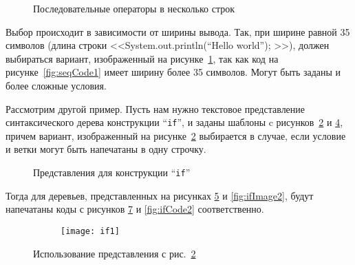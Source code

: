 \begin{figure}[h!]
	\centering
	
	\caption{Последовательные операторы в несколько строк}
	\label{fig:seqCode2}
\end{figure}

Выбор происходит в зависимости от ширины вывода. Так, при ширине равной 35 символов (длина строки <<System.out.println(“Hello world”); >>), должен выбираться вариант, изображенный на рисунке~\ref{fig:seqCode2}, так как код на рисунке~\ref{fig:seqCode1} имеет ширину более 35 символов.
Могут быть заданы и более сложные условия.

Рассмотрим другой пример. Пусть нам нужно текстовое представление синтаксического дерева конструкции “\lstinline{if}”, и заданы шаблоны c рисунков~\ref{fig:ifTemplate2} и \ref{fig:ifTemplate1}, причем вариант, изображенный на рисунке~\ref{fig:ifTemplate2} выбирается в случае, если условие и ветки могут быть напечатаны в одну строчку.

\begin{figure}[h!]
	\begin{subfigure}[b]{0.45\textwidth}
		
		\caption{}
		\label{fig:ifTemplate2}
	\end{subfigure}
	\hspace{1cm}
	\begin{subfigure}[b]{0.45\textwidth}
		
		\caption{}
		\label{fig:ifTemplate1}
	\end{subfigure}
	\caption{Представления для конструкции “\lstinline{if}”}
\end{figure}


Тогда для деревьев, представленных на рисунках \ref{fig:ifImage1} и \ref{fig:ifImage2}, будут напечатаны коды с рисунков \ref{fig:ifCode1} и \ref{fig:ifCode2} соответственно.

\begin{figure}[h!]
	\begin{subfigure}[b]{0.60\linewidth}
		\centering
		\texttt{[image: if1]}
		\caption{}
		\label{fig:ifImage1}
	\end{subfigure}
	\hspace{0.5cm}
	\begin{subfigure}[b]{0.30\linewidth}
		\centering
		
		\caption{}
		\label{fig:ifCode1}
	\end{subfigure}

	\caption{Использование представления с рис.~\ref{fig:ifTemplate2}}
\end{figure}

